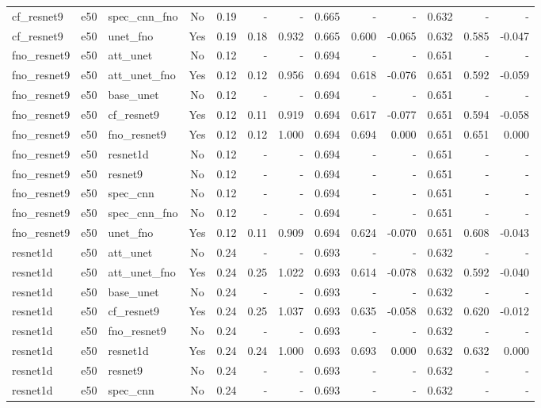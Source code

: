 \begin{tabular}{l l l c r r r r r r r r r}
cf_resnet9 & e50 & spec_cnn_fno & No & 0.19 & - & - & 0.665 & - & - & 0.632 & - & - \\
cf_resnet9 & e50 & unet_fno & Yes & 0.19 & 0.18 & 0.932 & 0.665 & 0.600 & -0.065 & 0.632 & 0.585 & -0.047 \\
fno_resnet9 & e50 & att_unet & No & 0.12 & - & - & 0.694 & - & - & 0.651 & - & - \\
fno_resnet9 & e50 & att_unet_fno & Yes & 0.12 & 0.12 & 0.956 & 0.694 & 0.618 & -0.076 & 0.651 & 0.592 & -0.059 \\
fno_resnet9 & e50 & base_unet & No & 0.12 & - & - & 0.694 & - & - & 0.651 & - & - \\
fno_resnet9 & e50 & cf_resnet9 & Yes & 0.12 & 0.11 & 0.919 & 0.694 & 0.617 & -0.077 & 0.651 & 0.594 & -0.058 \\
fno_resnet9 & e50 & fno_resnet9 & Yes & 0.12 & 0.12 & 1.000 & 0.694 & 0.694 & 0.000 & 0.651 & 0.651 & 0.000 \\
fno_resnet9 & e50 & resnet1d & No & 0.12 & - & - & 0.694 & - & - & 0.651 & - & - \\
fno_resnet9 & e50 & resnet9 & No & 0.12 & - & - & 0.694 & - & - & 0.651 & - & - \\
fno_resnet9 & e50 & spec_cnn & No & 0.12 & - & - & 0.694 & - & - & 0.651 & - & - \\
fno_resnet9 & e50 & spec_cnn_fno & No & 0.12 & - & - & 0.694 & - & - & 0.651 & - & - \\
fno_resnet9 & e50 & unet_fno & Yes & 0.12 & 0.11 & 0.909 & 0.694 & 0.624 & -0.070 & 0.651 & 0.608 & -0.043 \\
resnet1d & e50 & att_unet & No & 0.24 & - & - & 0.693 & - & - & 0.632 & - & - \\
resnet1d & e50 & att_unet_fno & Yes & 0.24 & 0.25 & 1.022 & 0.693 & 0.614 & -0.078 & 0.632 & 0.592 & -0.040 \\
resnet1d & e50 & base_unet & No & 0.24 & - & - & 0.693 & - & - & 0.632 & - & - \\
resnet1d & e50 & cf_resnet9 & Yes & 0.24 & 0.25 & 1.037 & 0.693 & 0.635 & -0.058 & 0.632 & 0.620 & -0.012 \\
resnet1d & e50 & fno_resnet9 & No & 0.24 & - & - & 0.693 & - & - & 0.632 & - & - \\
resnet1d & e50 & resnet1d & Yes & 0.24 & 0.24 & 1.000 & 0.693 & 0.693 & 0.000 & 0.632 & 0.632 & 0.000 \\
resnet1d & e50 & resnet9 & No & 0.24 & - & - & 0.693 & - & - & 0.632 & - & - \\
resnet1d & e50 & spec_cnn & No & 0.24 & - & - & 0.693 & - & - & 0.632 & - & - \\

\end{tabular}
